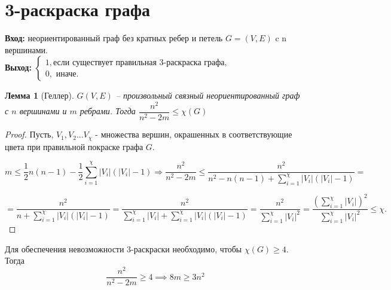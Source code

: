 \documentclass[a4paper, 12pt]{article}
\newtheorem{lemma}{Лемма}
\theoremstyle{definition}
\theoremstyle{remark}
\begin{document}
\section*{3-раскраска графа}
\textbf{Вход:} неориентированный граф без кратных ребер и петель $G = (V, E)$ c n вершинами.
\\
\textbf{Выход:} $\begin{cases}
    1,\text{если существует правильная 3-раскраска графа,}\\
    0,\text{ иначе.}
\end{cases}$
\begin{lemma}[Геллер]
    $G(V,E)$ -- произвольный связный неориентированный граф с $n$ вершинами и $m$ ребрами. Тогда $\dfrac{n^2}{n^2 - 2m} \leqslant \chi(G) $
\end{lemma}
\begin{proof}
    Пусть, $V_1,V_2...V_\chi$ - множества вершин, окрашенных в соответствующие цвета при правильной покраске графа $G$.

    $$m \leqslant \dfrac{1}{2}n(n - 1) - \dfrac{1}{2}\sum\limits^{\chi}_{i = 1}|V_i|(|V_i| - 1) \Rightarrow \dfrac{n^2}{n^2 - 2m} \leqslant \dfrac{n^2}{n^2 -n(n - 1) + \sum\limits^{\chi}_{i = 1}|V_i|(|V_i| - 1)} =$$

$$=  \dfrac{n^2}{n + \sum\limits^{\chi}_{i = 1}|V_i|(|V_i| - 1)} =\dfrac{n^2}{\sum\limits^{\chi}_{i = 1}|V_i| + \sum\limits^{\chi}_{i = 1}|V_i|(|V_i| - 1)} = \dfrac{n^2}{\sum\limits^{\chi}_{i = 1}|V_i|^2} = \dfrac{(\sum\limits^{\chi}_{i = 1}|V_i|)^2}{\sum\limits^{\chi}_{i = 1}|V_i|^2} \leqslant \chi.$$
\end{proof}
Для обеспечения невозможности 3-раскраски необходимо, чтобы $\chi(G) \geqslant 4$. Тогда
\[\frac{n^2}{n^2-2m} \geqslant 4\implies 8m \geqslant 3n^2\]
\end{document}
